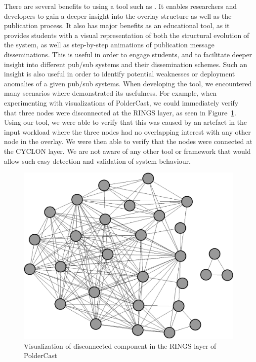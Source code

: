 There are several benefits to using a tool such as \demo. It enables
researchers and developers to gain a deeper insight into the overlay
structure as well as the publication process. It also has major benefits
as an educational tool, as it provides students with a visual
representation of both the structural evolution of the system, as well
as step-by-step animations of publication message disseminations. This
is useful in order to engage students, and to facilitate deeper insight
into different pub/sub systems and their dissemination schemes. Such an
insight is also useful in order to identify potential weaknesses or
deployment anomalies of a given pub/sub systems. When developing the
tool, we encountered many scenarios where \demo{} demonstrated its
usefulness. For example, when experimenting with visualizations of
PolderCast, we could immediately verify that three nodes were
disconnected at the RINGS layer, as seen in Figure~\ref{fig:pold_disc}.
Using our tool, we were able to verify that this was caused by an
artefact in the input workload where the three nodes had no overlapping
interest with any other node in the overlay. We were then able to verify
that the nodes were connected at the CYCLON layer. We are not aware of
any other tool or framework that would allow such easy detection and
validation of system behaviour.

\begin{figure}[h]
\includegraphics[width=\linewidth]{figures/disconnected-component-poldercast.pdf}
\caption{Visualization of disconnected component in the RINGS layer of PolderCast}
\label{fig:pold_disc}
\end{figure}

